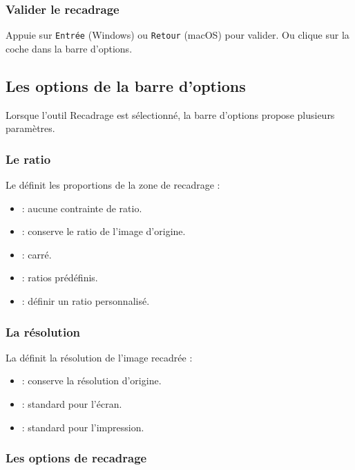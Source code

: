 \subsubsection{Valider le recadrage}

Appuie sur \texttt{Entrée} (Windows) ou \texttt{Retour} (macOS) pour valider. Ou clique sur la coche dans la barre d'options.

\subsection{Les options de la barre d'options}

Lorsque l'outil Recadrage est sélectionné, la barre d'options propose plusieurs paramètres.

\subsubsection{Le ratio}

Le  définit les proportions de la zone de recadrage :

\begin{itemize}
    \item {} : aucune contrainte de ratio.
    \item {} : conserve le ratio de l'image d'origine.
    \item {} : carré.
    \item {} : ratios prédéfinis.
    \item {} : définir un ratio personnalisé.
\end{itemize}

\subsubsection{La résolution}

La  définit la résolution de l'image recadrée :

\begin{itemize}
    \item {} : conserve la résolution d'origine.
    \item {} : standard pour l'écran.
    \item {} : standard pour l'impression.
\end{itemize}

\subsubsection{Les options de recadrage}

